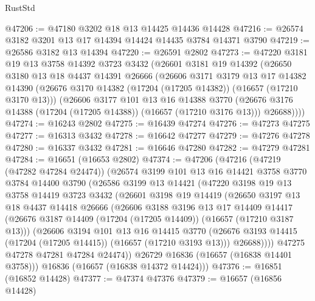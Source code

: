 \begin{lexlean}{RustStd}
\begin{coremodule}
@47206 := @47180 @3202 @18 @13 @14425 @14436 @14428
@47216 := @26574 @3182 @3201 @13 @17 @14394 @14424 @14435 @3784 @14371 @3790
@47219 := @26586 @3182 @13 @14394
@47220 := @26591 @2802
@47273 := @47220
    @3181
    @19
    @13
    @3758
    @14392
    @3723
    @3432
    (@26601
      @3181
      @19
      @14392
      (@26650
        @3180
        @13
        @18
        @4437
        @14391
        @26666
        (@26606
          @3171
          @3179
          @13
          @17
          @14382
          @14390
          (@26676 @3170 @14382 (@17204 (@17205 @14382)) (@16657 (@17210 @3170 @13)))
          (@26606
            @3177
            @101
            @13
            @16
            @14388
            @3770
            (@26676 @3176 @14388 (@17204 (@17205 @14388)) (@16657 (@17210 @3176 @13)))
            @26688))))
@47274 := @16243 @2802
@47275 := @16439 @47274
@47276 := @47273 @47275
@47277 := @16313 @3432
@47278 := @16642 @47277
@47279 := @47276 @47278
@47280 := @16337 @3432
@47281 := @16646 @47280
@47282 := @47279 @47281
@47284 := @16651 (@16653 @2802)
@47374 := @47206
    (@47216
      (@47219 (@47282 @47284 @24474))
      (@26574
        @3199
        @101
        @13
        @16
        @14421
        @3758
        @3770
        @3784
        @14400
        @3790
        (@26586
          @3199
          @13
          @14421
          (@47220
            @3198
            @19
            @13
            @3758
            @14419
            @3723
            @3432
            (@26601
              @3198
              @19
              @14419
              (@26650
                @3197
                @13
                @18
                @4437
                @14418
                @26666
                (@26606
                  @3188
                  @3196
                  @13
                  @17
                  @14409
                  @14417
                  (@26676 @3187 @14409 (@17204 (@17205 @14409)) (@16657 (@17210 @3187 @13)))
                  (@26606
                    @3194
                    @101
                    @13
                    @16
                    @14415
                    @3770
                    (@26676 @3193 @14415 (@17204 (@17205 @14415)) (@16657 (@17210 @3193 @13)))
                    @26688))))
            @47275
            @47278
            @47281
            @47284
            @24474))
        @26729
        @16836
        (@16657 (@16838 @14401 @3758)))
      @16836
      (@16657 (@16838 @14372 @14424)))
@47376 := @16851 (@16852 @14428)
@47377 := @47374 @47376
@47379 := @16657 (@16856 @14428)

\end{coremodule}
\end{lexlean}
